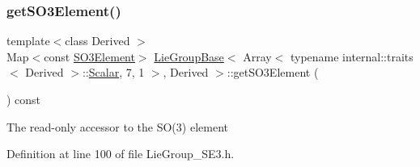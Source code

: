 \subsubsection{\texorpdfstring{get\+S\+O3\+Element()}{getSO3Element()}\hspace{0.1cm}{\footnotesize\ttfamily [2/2]}}
{\footnotesize\ttfamily template$<$class Derived $>$ \\
Map$<$const \hyperlink{class_lie_group_base_3_01_array_3_01typename_01internal_1_1traits_3_01_derived_01_4_1_1_scalar_0d6d4b5459662fc32c7117aee50362fb1_a2594349e8f4329af620dff380a457890}{S\+O3\+Element}$>$ \hyperlink{class_lie_group_base}{Lie\+Group\+Base}$<$ Array$<$ typename internal\+::traits$<$ Derived $>$\+::\hyperlink{class_lie_group_base_3_01_array_3_01typename_01internal_1_1traits_3_01_derived_01_4_1_1_scalar_0d6d4b5459662fc32c7117aee50362fb1_a831695c575380c9a1df32eff9fc4a8c6}{Scalar}, 7, 1 $>$, Derived $>$\+::get\+S\+O3\+Element (\begin{DoxyParamCaption}{ }\end{DoxyParamCaption}) const\hspace{0.3cm}{\ttfamily [inline]}}

The read-\/only accessor to the S\+O(3) element 

Definition at line 100 of file Lie\+Group\+\_\+\+S\+E3.\+h.

\hypertarget{class_lie_group_base_3_01_array_3_01typename_01internal_1_1traits_3_01_derived_01_4_1_1_scalar_0d6d4b5459662fc32c7117aee50362fb1_a00b4561ff5794f6a62dbfb125c164990}{}\label{class_lie_group_base_3_01_array_3_01typename_01internal_1_1traits_3_01_derived_01_4_1_1_scalar_0d6d4b5459662fc32c7117aee50362fb1_a00b4561ff5794f6a62dbfb125c164990} 
